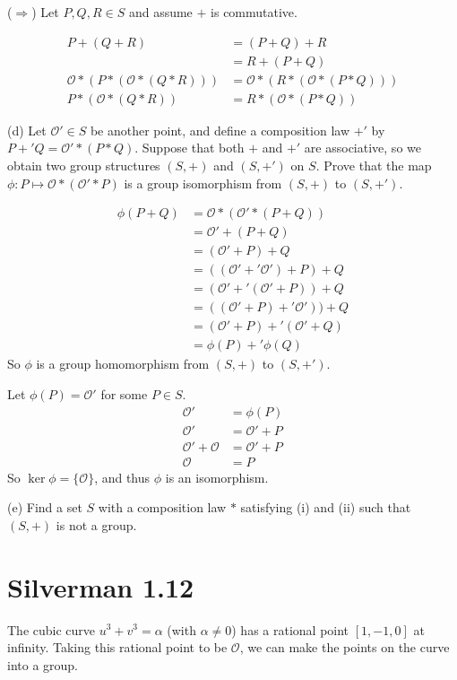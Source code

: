 \documentclass{article}
\begin{document}
($\Rightarrow$) Let $P,Q,R \in S$ and assume $+$ is commutative.

\begin{align*}
P + (Q + R) &= (P + Q) + R \\
&= R + (P + Q) \\
\mathcal{O} * (P * (\mathcal{O} * (Q * R))) &= \mathcal{O} * ( R * (\mathcal{O} * (P * Q))) \\
P * (\mathcal{O} * (Q * R)) &= R * (\mathcal{O} * (P * Q))
\end{align*}

(d) Let $\mathcal{O}' \in S$ be another point, and define a composition law $+'$ by $P +' Q = \mathcal{O}' * (P*Q)$. Suppose that both $+$ and $+'$ are associative, so we obtain two group structures $(S,+)$ and $(S,+')$ on $S$. Prove that the map $\phi: P \mapsto \mathcal{O}*(\mathcal{O}'*P)$ is a group isomorphism from $(S,+)$ to $(S,+')$.

\begin{align*}
\phi(P+Q) &= \mathcal{O} * (\mathcal{O}' * (P + Q)) \\
&= \mathcal{O}' + (P+Q) \\
&= (\mathcal{O}'+P)+Q \\
&= ((\mathcal{O}' +' \mathcal{O}')+P)+Q \\
&= (\mathcal{O}' +' (\mathcal{O}'+P))+Q \\
&= ((\mathcal{O}'+P) +' \mathcal{O}')) + Q \\
&= (\mathcal{O}'+P) +' (\mathcal{O}' + Q) \\
&= \phi(P) +' \phi(Q)
\end{align*}
So $\phi$ is a group homomorphism from $(S,+)$ to $(S,+')$.

Let $\phi(P) = \mathcal{O}'$ for some $P \in S$.
\begin{align*}
\mathcal{O}' &= \phi(P) \\
\mathcal{O}' &= \mathcal{O}' + P \\
\mathcal{O}' + \mathcal{O} &= \mathcal{O}' + P \\
\mathcal{O} &= P
\end{align*}
So $\ker\phi = \{\mathcal{O}\}$, and thus $\phi$ is an isomorphism.

(e) Find a set $S$ with a composition law $*$ satisfying (i) and (ii) such that $(S,+)$ is not a group.

\section{Silverman 1.12}
The cubic curve $u^3 + v^3 = \alpha$ (with $\alpha \neq 0$) has a rational point $[1,-1,0]$ at infinity. Taking this rational point to be $\mathcal{O}$, we can make the points on the curve into a group.
\end{document}
